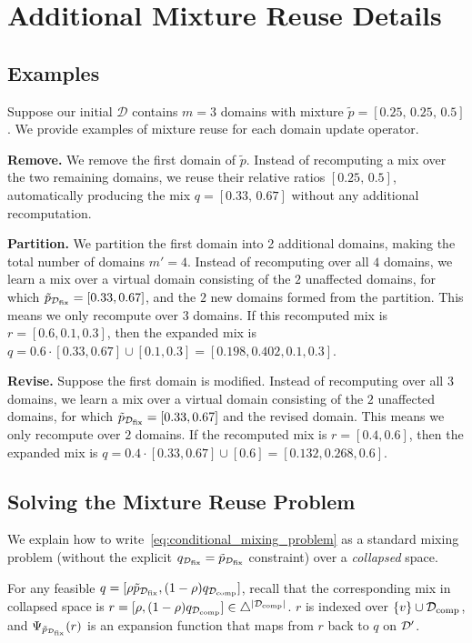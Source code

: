 \section{Additional Mixture Reuse Details}

\subsection{Examples}\label{supp:examples}

Suppose our initial $\mathcal{D}$ contains $m=3$ domains with mixture $\tilde{p} = [0.25,\,0.25,\,0.5]$. We provide examples of mixture reuse for each domain update operator.

\textbf{Remove.} We remove the first domain of $\tilde{p}$. Instead of recomputing a mix over the two remaining domains, we reuse their relative ratios $[0.25,\,0.5]$, automatically producing the mix $q=[0.33,\,0.67]$ without any additional recomputation.  

\textbf{Partition.} We partition the first domain into 2 additional domains, making the total number of domains $m'=4$. Instead of recomputing over all $4$ domains, we learn a mix over a virtual domain consisting of the $2$ unaffected domains, for which $\tilde{p}_{\mathcal{D}_{\text{fix}}} = [0.33, 0.67]$, and the $2$ new domains formed from the partition. This means we only recompute over $3$ domains. If this recomputed mix is $r = [0.6, 0.1, 0.3]$, then the expanded mix is $q = 0.6 \cdot [0.33, 0.67] \cup [0.1, 0.3] = [0.198, 0.402, 0.1, 0.3]$.


\textbf{Revise.} Suppose the first domain is modified. Instead of recomputing over all $3$ domains, we learn a mix over a virtual domain consisting of the $2$ unaffected domains, for which $\tilde{p}_{\mathcal{D}_{\text{fix}}} = [0.33, 0.67]$ and the revised domain. This means we only recompute over $2$ domains. If the recomputed mix is $r=[0.4, 0.6]$, then the expanded mix is $q = 0.4 \cdot [0.33, 0.67] \cup [0.6] = [0.132, 0.268, 0.6]$.


\subsection{Solving the Mixture Reuse Problem}\label{supp:collapsed_space}

We explain how to write~\eqref{eq:conditional_mixing_problem} as a standard mixing problem (without the explicit $q_{\mathcal{D}_{\text{fix}}} = \tilde{p}_{\mathcal{D}_{\text{fix}}}$ constraint) over a \textit{collapsed} space. 

For any feasible $q = [\rho \tilde{p}_{\mathcal{D}_{\text{fix}}}, (1 - \rho) q_{\mathcal{D}_{\text{comp}}}]$, recall that the corresponding mix in collapsed space is $r = [\rho, (1 - \rho) q_{\mathcal{D}_{\text{comp}}}] \in \triangle^{|\mathcal{D}_{\text{comp}}|}$. $r$ is indexed over $\{v\} \cup \mathcal{D}_{\text{comp}}$, and $\Psi_{\tilde{p}_{\mathcal{D}_{\text{fix}}}}(r)$ is an expansion function that maps from $r$ back to $q$ on $\mathcal{D}'$.

